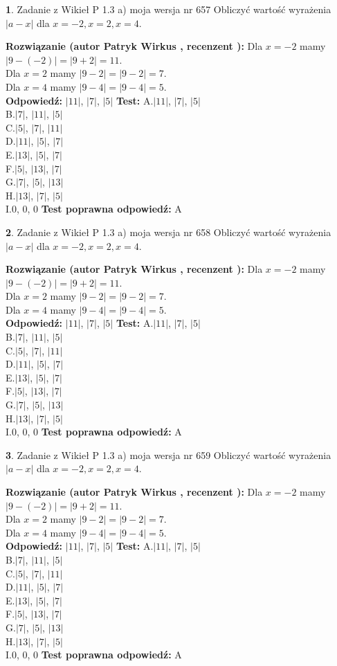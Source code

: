 \documentclass[12pt, a4paper]{article}
\theoremstyle{definition} %
\newtheorem{zad}{}
\newcommand{\zadStart}[1]{\begin{zad}#1\newline}
\newcommand{\zadStop}{\end{zad}}
\newcommand{\rozwStart}[2]{\noindent \textbf{Rozwiązanie (autor #1 , recenzent #2): }\newline}
\newcommand{\rozwStop}{\newline}
\newcommand{\odpStart}{\noindent \textbf{Odpowiedź:}\newline}
\newcommand{\odpStop}{\newline}
\newcommand{\testStart}{\noindent \textbf{Test:}\newline}
\newcommand{\testStop}{\newline}
\newcommand{\kluczStart}{\noindent \textbf{Test poprawna odpowiedź:}\newline}
\newcommand{\kluczStop}{\newline}
\begin{document}
\zadStart{Zadanie z Wikieł P 1.3 a) moja wersja nr 657}
Obliczyć wartość wyrażenia $|a - x|$ dla $x=-2,x=2,x=4$.
\zadStop
\rozwStart{Patryk Wirkus}{}
Dla $x = -2$ mamy $|9 - (-2)| = |9 + 2| = 11$.\\
Dla $x = 2$ mamy $|9 - 2| = |9 - 2| = 7$.\\
Dla $x = 4$ mamy $|9 - 4| = |9 - 4| = 5$.\\
\rozwStop
\odpStart
$|11|$, $|7|$, $|5|$
\odpStop
\testStart
A.$|11|$, $|7|$, $|5|$\\
B.$|7|$, $|11|$, $|5|$\\
C.$|5|$, $|7|$, $|11|$\\
D.$|11|$, $|5|$, $|7|$\\
E.$|13|$, $|5|$, $|7|$\\
F.$|5|$, $|13|$, $|7|$\\
G.$|7|$, $|5|$, $|13|$\\
H.$|13|$, $|7|$, $|5|$\\
I.$0$, $0$, $0$
\testStop
\kluczStart
A
\kluczStop



\zadStart{Zadanie z Wikieł P 1.3 a) moja wersja nr 658}
Obliczyć wartość wyrażenia $|a - x|$ dla $x=-2,x=2,x=4$.
\zadStop
\rozwStart{Patryk Wirkus}{}
Dla $x = -2$ mamy $|9 - (-2)| = |9 + 2| = 11$.\\
Dla $x = 2$ mamy $|9 - 2| = |9 - 2| = 7$.\\
Dla $x = 4$ mamy $|9 - 4| = |9 - 4| = 5$.\\
\rozwStop
\odpStart
$|11|$, $|7|$, $|5|$
\odpStop
\testStart
A.$|11|$, $|7|$, $|5|$\\
B.$|7|$, $|11|$, $|5|$\\
C.$|5|$, $|7|$, $|11|$\\
D.$|11|$, $|5|$, $|7|$\\
E.$|13|$, $|5|$, $|7|$\\
F.$|5|$, $|13|$, $|7|$\\
G.$|7|$, $|5|$, $|13|$\\
H.$|13|$, $|7|$, $|5|$\\
I.$0$, $0$, $0$
\testStop
\kluczStart
A
\kluczStop



\zadStart{Zadanie z Wikieł P 1.3 a) moja wersja nr 659}
Obliczyć wartość wyrażenia $|a - x|$ dla $x=-2,x=2,x=4$.
\zadStop
\rozwStart{Patryk Wirkus}{}
Dla $x = -2$ mamy $|9 - (-2)| = |9 + 2| = 11$.\\
Dla $x = 2$ mamy $|9 - 2| = |9 - 2| = 7$.\\
Dla $x = 4$ mamy $|9 - 4| = |9 - 4| = 5$.\\
\rozwStop
\odpStart
$|11|$, $|7|$, $|5|$
\odpStop
\testStart
A.$|11|$, $|7|$, $|5|$\\
B.$|7|$, $|11|$, $|5|$\\
C.$|5|$, $|7|$, $|11|$\\
D.$|11|$, $|5|$, $|7|$\\
E.$|13|$, $|5|$, $|7|$\\
F.$|5|$, $|13|$, $|7|$\\
G.$|7|$, $|5|$, $|13|$\\
H.$|13|$, $|7|$, $|5|$\\
I.$0$, $0$, $0$
\testStop
\kluczStart
A
\kluczStop
\end{document}
